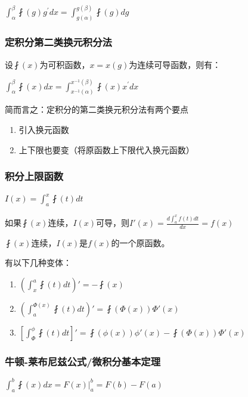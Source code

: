 \documentclass[UTF8]{ctexbook}
\newcommand{\derivative}{^\prime}
\newcommand{\defFunction}[1]{\fint(#1)}
\newcommand{\definiteIntegral}[2]{\int^{#1}_{#2}}
\begin{document}
{{{{  $\definiteIntegral{\beta}{\alpha} \defFunction{g}g\derivative dx = \definiteIntegral{g(\beta)}{g(\alpha)} \defFunction{g}dg$
}%

\subsubsection{定积分第二类换元积分法}{
  设$\defFunction{x}$为可积函数，$x = x(g)$为连续可导函数，则有：

  $\definiteIntegral{\beta}{\alpha} \defFunction{x}dx = \definiteIntegral{x^{-1}(\beta)}{x^{-1}(\alpha)}\defFunction{x}x\derivative dx$

  简而言之：定积分的第二类换元积分法有两个要点
  \begin{enumerate}
    \item 引入换元函数
    \item 上下限也要变（将原函数上下限代入换元函数）
  \end{enumerate}
}%

\subsubsection{积分上限函数}{
  $I(x) = \definiteIntegral{x}{a}\defFunction{t}dt$

  如果$\defFunction{x}连续$，$I(x)$可导，则$I\prime(x) = \frac{d\definiteIntegral{x}{a}f(t)dt}{dx} = f(x)$

  $\defFunction{x}$连续，$I(x)$是$f(x)$的一个原函数。

  有以下几种变体：

  \begin{enumerate}
    \item $(\definiteIntegral{a}{x}\defFunction{t}dt)\prime = -\defFunction{x}$
    \item $(\definiteIntegral{\Phi(x)}{a}\defFunction{t}dt)\prime = \defFunction{\Phi(x)}\Phi\prime(x)$
    \item $[\definiteIntegral{\phi}{\Phi}\defFunction{t}dt]\prime = \defFunction{\phi(x)}\phi\prime(x) - \defFunction{\Phi(x)}\Phi\prime(x)$
  \end{enumerate}

}%

\subsubsection{牛顿-莱布尼兹公式/微积分基本定理}{
  $\definiteIntegral{b}{a}\defFunction{x}dx = F(x)|^b_a = F(b) - F(a)$
}%

}}}
\end{document}
